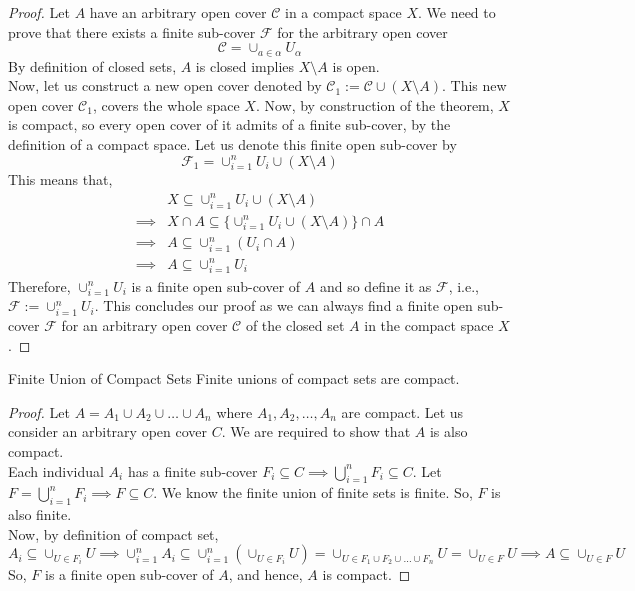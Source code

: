 \begin{proof}
    Let $A$ have an arbitrary open cover $\mathcal{C}$ in a compact space $X$. We need to prove that there exists a finite sub-cover $\mathcal{F}$ for the arbitrary open cover $$\mathcal{C}=\cup_{a\in\alpha}U_\alpha$$ By definition of closed sets, $A$ is closed implies $X\setminus A$ is open.\\
    Now, let us construct a new open cover denoted by $\mathcal{C}_1:=\mathcal{C}\cup(X\setminus A)$. This new open cover $\mathcal{C}_1$, covers the whole space $X$. Now, by construction of the theorem, $X$ is compact, so every open cover of it admits of a finite sub-cover, by the definition of a compact space. Let us denote this finite open sub-cover by $$\mathcal{F}_1=\cup_{i=1}^nU_i\cup(X\setminus A)$$ This means that,
    \begin{align*}
        &X\subseteq\cup_{i=1}^nU_i\cup(X\setminus A)\\
        \implies& X\cap A\subseteq\{\cup_{i=1}^nU_i\cup(X\setminus A)\}\cap A\\
        \implies& A\subseteq\cup_{i=1}^n(U_i\cap A)\\
        \implies& A\subseteq\cup_{i=1}^nU_i
    \end{align*}
    Therefore, $\cup_{i=1}^nU_i$ is a finite open sub-cover of $A$ and so define it as $\mathcal{F}$, i.e., $\mathcal{F}:=\cup_{i=1}^nU_i$. This concludes our proof as we can always find a finite open sub-cover $\mathcal{F}$ for an arbitrary open cover $\mathcal{C}$ of the closed set $A$ in the compact space $X$.
\end{proof}
\begin{Theorem}{Finite Union of Compact Sets}\label{finite_union_compact_sets}
    Finite unions of compact sets are compact.
\end{Theorem}
\begin{proof}
    Let $A=A_1\cup A_2\cup\dots\cup A_n$ where $A_1, A_2,\dots ,A_n$ are compact. Let us consider an arbitrary open cover $C$. We are required to show that $A$ is also compact.\\ Each individual $A_i$ has a finite sub-cover $F_i\subseteq C\implies\bigcup_{i=1}^nF_i\subseteq C$. Let $F=\bigcup_{i=1}^nF_i\implies F\subseteq C$. We know the finite union of finite sets is finite. So, $F$ is also finite. \\
    Now, by definition of compact set, $$A_i\subseteq\cup_{U\in F_i}U\implies\cup_{i=1}^nA_i\subseteq\cup_{i=1}^n(\cup_{U\in F_i}U)=\cup_{U\in F_1\cup F_2\cup\dots\cup F_n}U=\cup_{U\in F}U\implies A\subseteq\cup_{U\in F}U$$ So, $F$ is a finite open sub-cover of $A$, and hence, $A$ is compact.
\end{proof}
